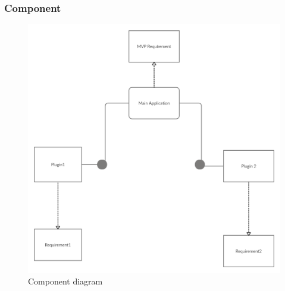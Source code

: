 \subsubsection{Component}
\par
\begin{figure}[h]
	\includegraphics[width=\textwidth]{componentdigram1}	
	\caption{Component diagram}
\end{figure}

